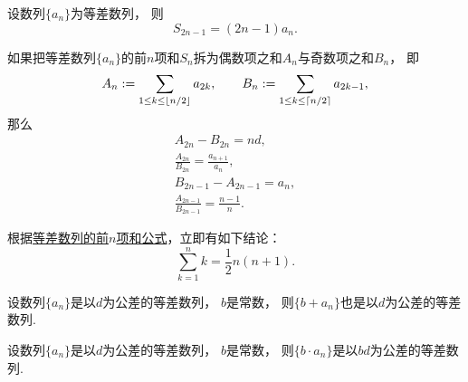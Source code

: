 \begin{property}
设数列\(\{a_n\}\)为等差数列，
则\begin{equation}
	S_{2n-1} = (2n-1) a_n.
\end{equation}
\end{property}

\begin{property}
如果把等差数列\(\{a_n\}\)的前\(n\)项和\(S_n\)拆为偶数项之和\(A_n\)与奇数项之和\(B_n\)，
即\begin{equation*}
	A_n := \sum_{1 \leq k \leq \lfloor n/2\rfloor} a_{2k},
	\qquad
	B_n := \sum_{1 \leq k \leq \lceil n/2\rceil} a_{2k-1},
\end{equation*}
那么\begin{gather}
	A_{2n} - B_{2n} = n d, \\
	\frac{A_{2n}}{B_{2n}} = \frac{a_{n+1}}{a_n}, \\
	B_{2n-1} - A_{2n-1} = a_n, \\
	\frac{A_{2n-1}}{B_{2n-1}} = \frac{n-1}{n}.
\end{gather}
\end{property}

根据\hyperref[equation:数列.等差数列的前n项和1]{等差数列的前\(n\)项和公式}，立即有如下结论：
\begin{equation}
    \sum_{k=1}^n k = \frac{1}{2} n(n+1).
\end{equation}

\begin{property}
设数列\(\{a_n\}\)是以\(d\)为公差的等差数列，
\(b\)是常数，
则\(\{b + a_n\}\)也是以\(d\)为公差的等差数列.
\end{property}

\begin{property}
设数列\(\{a_n\}\)是以\(d\)为公差的等差数列，
\(b\)是常数，
则\(\{b \cdot a_n\}\)是以\(b d\)为公差的等差数列.
\end{property}


